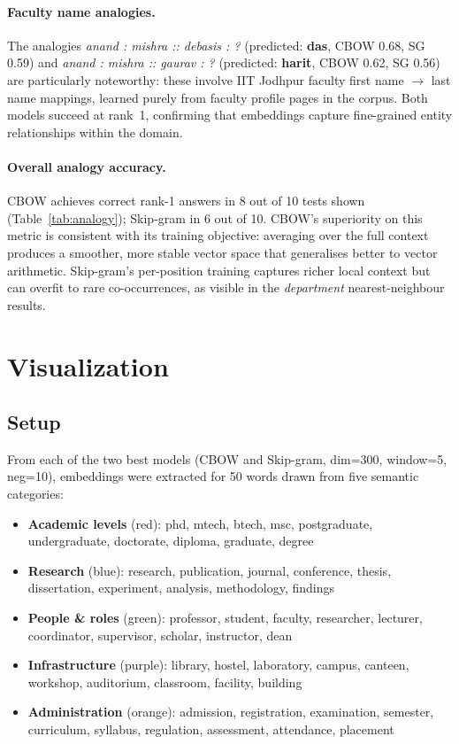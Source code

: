 \documentclass[12pt,a4paper]{article}
\begin{document}
\paragraph{Faculty name analogies.}
The analogies \textit{anand : mishra :: debasis : ?} (predicted: \textbf{das},
CBOW 0.68, SG 0.59) and \textit{anand : mishra :: gaurav : ?} (predicted:
\textbf{harit}, CBOW 0.62, SG 0.56) are particularly noteworthy: these involve
IIT Jodhpur faculty first name $\to$ last name mappings, learned purely from
faculty profile pages in the corpus. Both models succeed at rank~1, confirming
that embeddings capture fine-grained entity relationships within the domain.

\paragraph{Overall analogy accuracy.}
CBOW achieves correct rank-1 answers in 8 out of 10 tests shown
(Table~\ref{tab:analogy}); Skip-gram in 6 out of 10. CBOW's superiority on
this metric is consistent with its training objective: averaging over the full
context produces a smoother, more stable vector space that generalises better
to vector arithmetic. Skip-gram's per-position training captures richer local
context but can overfit to rare co-occurrences, as visible in the \textit{department}
nearest-neighbour results.

\newpage

\section{Visualization}

\subsection{Setup}

From each of the two best models (CBOW and Skip-gram, dim=300, window=5,
neg=10), embeddings were extracted for 50 words drawn from five semantic
categories:

\begin{itemize}[nosep]
    \item \textbf{Academic levels} (red): phd, mtech, btech, msc, postgraduate, undergraduate, doctorate, diploma, graduate, degree
    \item \textbf{Research} (blue): research, publication, journal, conference, thesis, dissertation, experiment, analysis, methodology, findings
    \item \textbf{People \& roles} (green): professor, student, faculty, researcher, lecturer, coordinator, supervisor, scholar, instructor, dean
    \item \textbf{Infrastructure} (purple): library, hostel, laboratory, campus, canteen, workshop, auditorium, classroom, facility, building
    \item \textbf{Administration} (orange): admission, registration, examination, semester, curriculum, syllabus, regulation, assessment, attendance, placement
\end{itemize}
\end{document}
